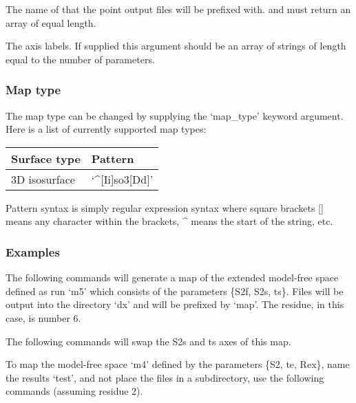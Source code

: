   The name of that the point output files will be prefixed with.
and must return an array of equal length.

  The axis labels.  If supplied this argument should be an array of strings of length equal to the number of parameters.

\subsubsection{Map type}

The map type can be changed by supplying the `map\_type' keyword argument.  Here is a list of
currently supported map types:


\begin{center}
\begin{tabular}{ll}
\toprule
Surface type & Pattern \\
\midrule
 3D isosurface                              &  `\^{}[Ii]so3[Dd]'                 \\
\bottomrule
\end{tabular}
\end{center}

Pattern syntax is simply regular expression syntax where square brackets [] means any
character within the brackets, \^{} means the start of the string, etc.


\subsubsection{Examples}

The following commands will generate a map of the extended model-free space defined as run
`m5' which consists of the parameters \{S2f, S2s, ts\}.  Files will be output into the
directory `dx' and will be prefixed by `map'.  The residue, in this case, is number 6.




The following commands will swap the S2s and ts axes of this map.



To map the model-free space `m4' defined by the parameters \{S2, te, Rex\}, name the results
`test', and not place the files in a subdirectory, use the following commands (assuming
residue 2).




